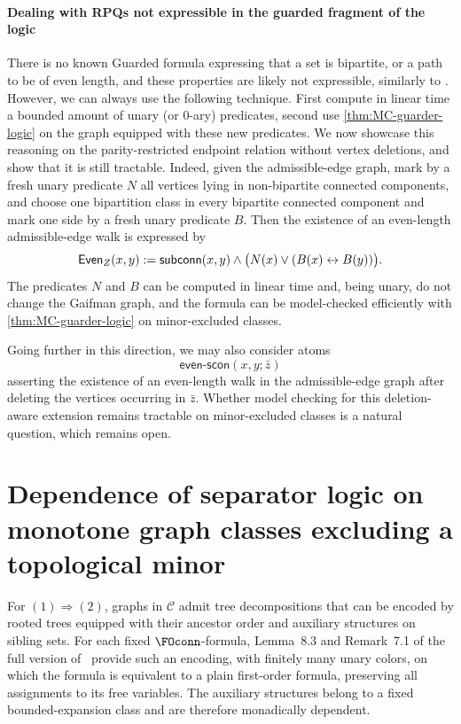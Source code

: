 \documentclass[1p,number,11pt]{elsarticle}
\newcommand{\scon}{\hbox{\sf subconn}}
\newcommand{\GFOscon}{\textup{Guarded}\raisebox{0.4pt}{\texttt{-}}\FOscon}
\theoremstyle{plain}
\newcommand{\Cc}{\mathscr{C}}
\begin{document}
\paragraph{Dealing with RPQs not expressible in the guarded fragment of the logic}

There is no known \GFOscon\xspace formula expressing that a set is bipartite, or a path to be of even length, and these properties are likely not expressible, similarly to \FOconn\xspace \cite[Theorem 3.12]{schirrmacher2023first}.
However, we can always use the following technique. First compute in linear time a bounded amount of unary (or 0-ary) predicates, second use \cref{thm:MC-guarder-logic} on the graph equipped with these new predicates. We now showcase this reasoning on 
the parity-restricted endpoint relation without vertex deletions, and show that it is still
tractable. Indeed, given the admissible-edge graph, mark by a fresh unary
predicate $N$ all vertices lying in non-bipartite connected components, and
choose one bipartition class in every bipartite connected component and mark
one side by a fresh unary predicate $B$. Then the existence of an even-length
admissible-edge walk is expressed by
\[
  \mathsf{Even}_Z(x,y):=
  \scon(x,y)\wedge
  \bigl(N(x)\vee(B(x)\leftrightarrow B(y))\bigr).
\]
The predicates $N$ and $B$ can be computed in linear time and, being unary,
do not change the Gaifman graph, and the formula can be model-checked efficiently with \cref{thm:MC-guarder-logic} on minor-excluded classes. 

Going further in this direction, we may also consider atoms
\[
  \mathsf{even\text{-}scon}(x,y;\bar z)
\]
asserting the existence of an even-length walk in the admissible-edge graph
after deleting the vertices occurring in $\bar z$. Whether model checking for
this deletion-aware extension remains tractable on minor-excluded classes is
a natural question, which remains open.

\newpage 


\clearpage
\appendix

\section{Dependence of separator logic on monotone graph classes excluding a topological minor}
\label{app:separator-characterization}


For $(1)\Rightarrow(2)$, graphs in $\Cc$ admit tree decompositions that can be encoded by rooted trees equipped with their ancestor order and auxiliary structures on sibling sets. For each fixed $\FOconn$-formula, Lemma~8.3 and Remark~7.1 of the full version of~\cite{pillipczuk2021connectivity} provide such an encoding, with finitely many unary colors, on which the formula is equivalent to a plain first-order formula, preserving all assignments to its free variables. The auxiliary structures belong to a fixed bounded-expansion class and are therefore monadically dependent.
\end{document}
